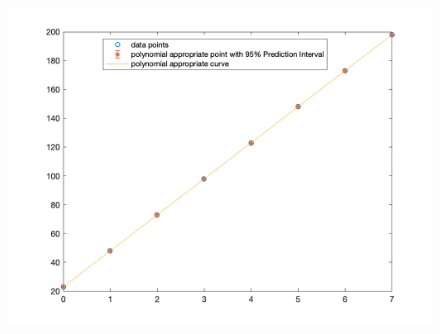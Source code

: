 \documentclass[12pt,a4paper]{article}
\begin{document}
\begin{spacing}{1.5}
        \begin{figure}[htbp]
		\centering
		\includegraphics[scale=0.3]{figure/1_2.png}
		\end{figure}




        \newpage

\end{spacing}
\end{document}
